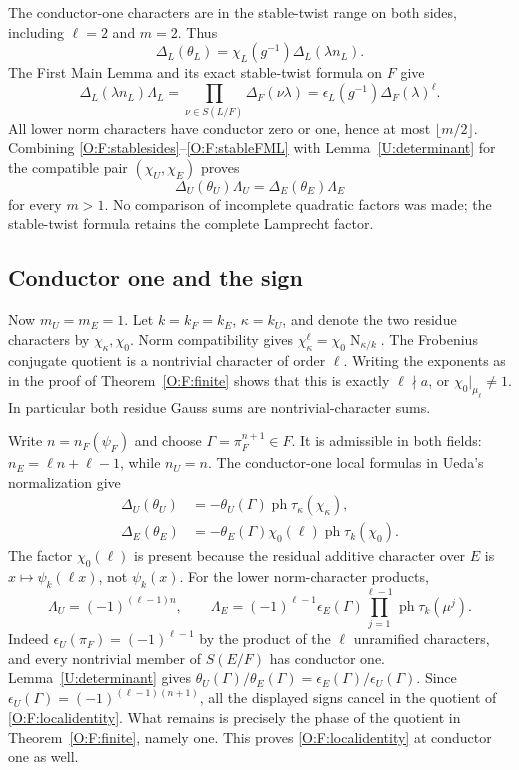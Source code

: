 \documentclass[11pt]{amsart}
\theoremstyle{definition}
\theoremstyle{remark}
\newcommand{\Nm}{\operatorname{N}}
\newcommand{\ph}{\operatorname{ph}}
\begin{document}
The conductor-one characters are in the stable-twist range on both
sides, including $\ell=2$ and $m=2$. Thus
\begin{equation}\label{O:F:stablesides}
 \Delta_L(\theta_L)=\chi_L(g^{-1})\Delta_L(\lambda n_L).
\end{equation}
The First Main Lemma and its exact stable-twist formula on $F$ give
\begin{equation}\label{O:F:stableFML}
 \Delta_L(\lambda n_L)\Lambda_L
 =\prod_{\nu\in S(L/F)}\Delta_F(\nu\lambda)
 =\epsilon_L(g^{-1})\Delta_F(\lambda)^\ell.
\end{equation}
All lower norm characters have conductor zero or one, hence at most
$\lfloor m/2\rfloor$. Combining \eqref{O:F:stablesides}--\eqref{O:F:stableFML}
with Lemma~\ref{U:determinant} for the compatible pair $(\chi_U,\chi_E)$
proves
\begin{equation}\label{O:F:localidentity}
 \Delta_U(\theta_U)\Lambda_U=\Delta_E(\theta_E)\Lambda_E
\end{equation}
for every $m>1$. No comparison of incomplete quadratic factors was
made; the stable-twist formula retains the complete Lamprecht factor.

\subsection{Conductor one and the sign}
Now $m_U=m_E=1$. Let $k=k_F=k_E$, $\kappa=k_U$, and denote the two
residue characters by $\chi_\kappa,\chi_0$.
Norm compatibility gives $\chi_\kappa^\ell=\chi_0\Nm_{\kappa/k}$.
The Frobenius conjugate quotient is a nontrivial character of order
$\ell$. Writing the exponents as in the proof of Theorem~\ref{O:F:finite}
shows that this is exactly $\ell\nmid a$, or
$\chi_0|_{\mu_\ell}\ne1$. In particular both residue Gauss sums are
nontrivial-character sums.

Write $n=n_F(\psi_F)$ and choose
$\Gamma=\pi_F^{n+1}\in F$. It is admissible in both fields:
$n_E=\ell n+\ell-1$, while $n_U=n$.
The conductor-one local formulas in Ueda's normalization give
\begin{align*}
 \Delta_U(\theta_U)&=-\theta_U(\Gamma)\ph\tau_\kappa(\chi_\kappa),\\
 \Delta_E(\theta_E)&=-\theta_E(\Gamma)\chi_0(\ell)
                                   \ph\tau_k(\chi_0).
\end{align*}
The factor $\chi_0(\ell)$ is present because the residual additive
character over $E$ is $x\mapsto\psi_k(\ell x)$, not $\psi_k(x)$.
For the lower norm-character products,
\[
 \Lambda_U=(-1)^{(\ell-1)n},\qquad
 \Lambda_E=(-1)^{\ell-1}\epsilon_E(\Gamma)
                 \prod_{j=1}^{\ell-1}\ph\tau_k(\mu^j).
\]
Indeed $\epsilon_U(\pi_F)=(-1)^{\ell-1}$ by the product of the
$\ell$ unramified characters, and every nontrivial member of
$S(E/F)$ has conductor one. Lemma~\ref{U:determinant} gives
$\theta_U(\Gamma)/\theta_E(\Gamma)
 =\epsilon_E(\Gamma)/\epsilon_U(\Gamma)$.
Since $\epsilon_U(\Gamma)=(-1)^{(\ell-1)(n+1)}$, all the displayed
signs cancel in the quotient of \eqref{O:F:localidentity}. What remains is
precisely the phase of the quotient in Theorem~\ref{O:F:finite}, namely
one. This proves \eqref{O:F:localidentity} at conductor one as well.
\end{document}
